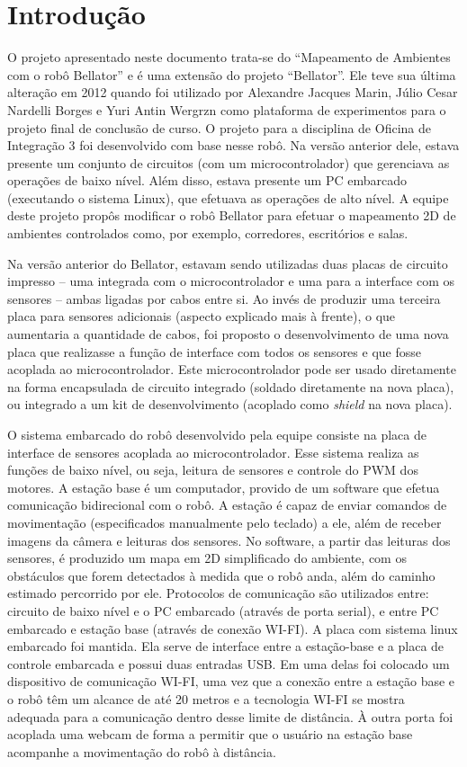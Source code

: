 \chapter{Introdução}

O projeto apresentado neste documento trata-se do “Mapeamento de Ambientes com o robô Bellator” e é uma extensão do projeto “Bellator”. Ele teve sua última alteração em 2012 quando foi utilizado por Alexandre Jacques Marin, Júlio Cesar Nardelli Borges e Yuri Antin Wergrzn como plataforma de experimentos para o projeto final de conclusão de curso. O projeto para a disciplina de Oficina de Integração 3 foi desenvolvido com base nesse robô. Na versão anterior dele, estava presente um conjunto de circuitos (com um microcontrolador) que gerenciava as operações de baixo nível. Além disso, estava presente um PC embarcado (executando o sistema Linux), que efetuava as operações de alto nível.
A equipe deste projeto propôs modificar o robô Bellator para efetuar o mapeamento 2D de ambientes controlados como, por exemplo, corredores, escritórios e salas.

Na versão anterior do Bellator, estavam sendo utilizadas duas placas de circuito impresso – uma integrada com o microcontrolador e uma para a interface com os sensores – ambas ligadas por cabos entre si. Ao invés de produzir uma terceira placa para sensores adicionais (aspecto explicado mais à frente), o que aumentaria a quantidade de cabos, foi proposto o desenvolvimento de uma nova placa que realizasse a função de interface com todos os sensores e que fosse acoplada ao microcontrolador. Este microcontrolador pode ser usado diretamente na forma encapsulada de circuito integrado (soldado diretamente na nova placa), ou integrado a um kit de desenvolvimento (acoplado como \textit{shield} na nova placa).

O sistema embarcado do robô desenvolvido pela equipe consiste na placa de interface de sensores acoplada ao microcontrolador. Esse sistema realiza as funções de baixo nível, ou seja, leitura de sensores e controle do PWM dos motores. A estação base é um computador, provido de um software que efetua comunicação bidirecional com o robô. A estação é capaz de enviar comandos de movimentação (especificados manualmente pelo teclado) a ele, além de receber imagens da câmera e leituras dos sensores. No software, a partir das leituras dos sensores, é produzido um mapa em 2D simplificado do ambiente, com os obstáculos que forem detectados à medida que o robô anda, além do caminho estimado percorrido por ele. Protocolos de comunicação são utilizados entre: circuito de baixo nível e o PC embarcado (através de porta serial), e entre PC embarcado e estação base (através de conexão WI-FI). A placa com sistema linux embarcado foi mantida. Ela serve de interface entre a estação-base e a placa de controle embarcada e possui duas entradas USB. Em uma delas foi colocado um dispositivo de comunicação WI-FI, uma vez que a conexão entre a estação base e o robô têm um alcance de até 20 metros e a tecnologia WI-FI se mostra adequada para a comunicação dentro desse limite de distância. À outra porta foi acoplada uma webcam de forma a permitir que o usuário na estação base acompanhe a movimentação do robô à distância.

